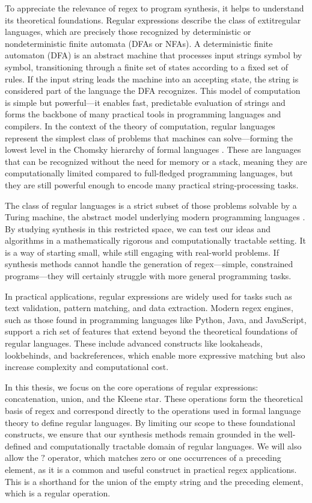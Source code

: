 \indent\indent To appreciate the relevance of regex to program synthesis, it helps to understand its theoretical foundations. Regular expressions describe the class of 	extit{regular languages}, which are precisely those recognized by deterministic or nondeterministic finite automata (DFAs or NFAs). A deterministic finite automaton (DFA) is an abstract machine that processes input strings symbol by symbol, transitioning through a finite set of states according to a fixed set of rules. If the input string leads the machine into an accepting state, the string is considered part of the language the DFA recognizes. This model of computation is simple but powerful—it enables fast, predictable evaluation of strings and forms the backbone of many practical tools in programming languages and compilers. In the context of the theory of computation, regular languages represent the simplest class of problems that machines can solve—forming the lowest level in the Chomsky hierarchy of formal languages \cite{chomsky_1956_three}. These are languages that can be recognized without the need for memory or a stack, meaning they are computationally limited compared to full-fledged programming languages, but they are still powerful enough to encode many practical string-processing tasks.

\indent\indent  The class of regular languages is a strict subset of those problems solvable by a Turing machine, the abstract model underlying modern programming languages \cite{sipser_1996_introduction}. By studying synthesis in this restricted space, we can test our ideas and algorithms in a mathematically rigorous and computationally tractable setting. It is a way of starting small, while still engaging with real-world problems. If synthesis methods cannot handle the generation of regex—simple, constrained programs—they will certainly struggle with more general programming tasks.

\indent\indent In practical applications, regular expressions are widely used for tasks such as text validation, pattern matching, and data extraction. Modern regex engines, such as those found in programming languages like Python, Java, and JavaScript, support a rich set of features that extend beyond the theoretical foundations of regular languages. These include advanced constructs like lookaheads, lookbehinds, and backreferences, which enable more expressive matching but also increase complexity and computational cost.

\indent\indent In this thesis, we focus on the core operations of regular expressions: concatenation, union, and the Kleene star. These operations form the theoretical basis of regex and correspond directly to the operations used in formal language theory to define regular languages. By limiting our scope to these foundational constructs, we ensure that our synthesis methods remain grounded in the well-defined and computationally tractable domain of regular languages. We will also allow the $?$ operator, which matches zero or one occurrences of a preceding element, as it is a common and useful construct in practical regex applications. This is a shorthand for the union of the empty string and the preceding element, which is a regular operation.

